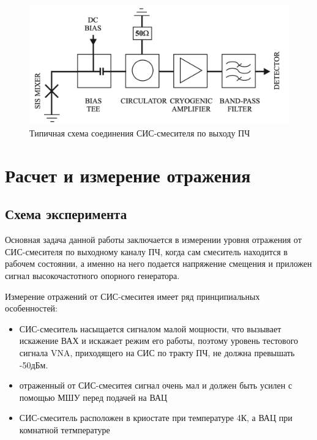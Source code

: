 \documentclass[a4paper]{article}
\begin{document}
\begin{itemize}
        \begin{figure}[H]
            \centering
            \includegraphics[scale=0.5]{barichev.png}
            \caption{Типичная схема соединения СИС-смесителя по выходу ПЧ \cite{Barichev}}
            \label{fig:barichev}
        \end{figure}
\end{itemize}

\section{Расчет и измерение отражения}

\subsection{Схема эксперимента}

Основная задача данной работы заключается в измерении уровня отражения от СИС-смесителя по выходному каналу ПЧ, когда сам смеситель находится в рабочем состоянии, а именно на него подается напряжение смещения и приложен сигнал высокочастотного опорного генератора. 

Измерение отражений от СИС-смеситея имеет ряд принципиальных особенностей:
\begin{itemize}
    \item СИС-смеситель насыщается сигналом малой мощности, что вызывает искажение ВАХ и искажает режим его работы, поэтому уровень тестового сигнала VNA, приходящего на СИС по тракту ПЧ, не должна превышать -50дБм. 
    \item отраженный от СИС-смеситея сигнал очень мал и должен быть усилен с помощью МШУ перед подачей на ВАЦ
    \item СИС-смеситель расположен в криостате при температуре 4К, а ВАЦ при комнатной тетмпературе
    
\end{itemize}
\end{document}
